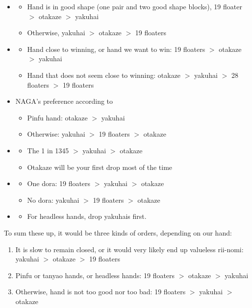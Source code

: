 \documentclass[12pt]{article}
\begin{document}
\begin{itemize}
  \item \citet{senba-yakuhai}
  \begin{itemize}
    \item Hand is in good shape (one pair and two good shape blocks), 19 floater $>$ otakaze $>$ yakuhai
    \item Otherwise, yakuhai $>$ otakaze $>$ 19 floaters
  \end{itemize}
  \item \citet{tsuchida-yakuhai}
  \begin{itemize}
    \item Hand close to winning, or hand we want to win: 19 floaters $>$ otakaze $>$ yakuhai
    \item Hand that does not seem close to winning: otakaze $>$ yakuhai $>$ 28 floaters $>$ 19 floaters
  \end{itemize}
  \item NAGA's preference according to \citet{naga-yakuhai}
  \begin{itemize}
    \item Pinfu hand: otakaze $>$ yakuhai
    \item Otherwise: yakuhai $>$ 19 floaters $>$ otakaze
  \end{itemize}
  \item \citet{shibukawa-yakuhai}
  \begin{itemize}
    \item The 1 in 1345 $>$ yakuhai $>$ otakaze
    \item Otakaze will be your first drop most of the time
  \end{itemize}
  \item \citet{yoteru-yakuhai}
  \begin{itemize}
    \item One dora: 19 floaters $>$ yakuhai $>$ otakaze
    \item No dora: yakuhai $>$ 19 floaters $>$ otakaze
  \end{itemize}
  \item \citet{chigo-yakuhai}
  \begin{itemize}
    \item For headless hands, drop yakuhais first.
  \end{itemize}
\end{itemize}

To sum these up, it would be three kinds of orders, depending on our hand:

\begin{enumerate}
\item It is slow to remain closed, or it would very likely end up valueless rii-nomi: yakuhai $>$ otakaze $>$ 19 floaters
\item Pinfu or tanyao hands, or headless hands: 19 floaters $>$ otakaze $>$ yakuhai
\item Otherwise, hand is not too good nor too bad: 19 floaters $>$ yakuhai $>$ otakaze
\end{enumerate}
\end{document}

